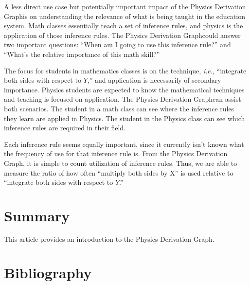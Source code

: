 \documentclass{article}
\newcommand{\ie}{\textit{i.e.}} %
\newcommand{\pdg}{Physics Derivation Graph}
\begin{document}
\begin{multicols}{2}
A less direct use case but potentially important impact of the \pdg is on understanding the relevance of what is being taught in the education system. Math classes essentially teach a set of inference rules, and physics is the application of those inference rules. The \pdg could answer two important questions: ``When am I going to use this inference rule?'' and ``What's the relative importance of this math skill?''

The focus for students in mathematics classes is on the technique, \ie, ``integrate both sides with respect to $Y$,'' and application is necessarily of secondary importance. Physics students are expected to know the mathematical techniques and teaching is focused on application. The \pdg can assist both scenarios. The student in a math class can see where the inference rules they learn are applied in Physics. The student in the Physics class can see which inference rules are required in their field. 

Each inference rule seems equally important, since it currently isn't known what the frequency of use for that inference rule is. From the \pdg, it is simple to count utilization of inference rules. Thus, we are able to measure the ratio of how often ``multiply both sides by X'' is used relative to ``integrate both sides with respect to $Y$.'' 

\section{Summary\label{sec:summary}}
This article provides an introduction to the \pdg. 

\section{Bibliography}


\end{multicols}

\newpage
\appendix
%
\end{document}

